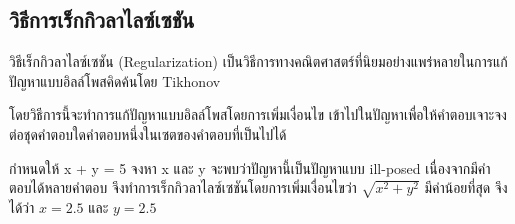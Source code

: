 \subsection{วิธีการเร็กกิวลาไลซ์เซชัน}
\hspace{1cm} วิธีเร็กกิวลาไลซ์เซชัน (Regularization) เป็นวิธีการทางคณิตศาสตร์ที่นิยมอย่างแพร่หลายในการแก้ปัญหาแบบอิลล์โพสคิดค้นโดย Tikhonov \cite{ref:regularization} 

\hspace{1cm} โดยวิธีการนี้จะทำการแก้ปัญหาแบบอิลล์โพสโดยการเพิ่มเงื่อนไข เข้าไปในปัญหาเพื่อให้คำตอบเจาะจงต่อชุดคำตอบใดคำตอบหนึ่งในเซตของคำตอบที่เป็นไปได้ 

\begin{Example}
    กำหนดให้ x + y = 5 จงหา x และ y
    จะพบว่าปัญหานี้เป็นปัญหาแบบ ill-posed เนื่องจากมีคำตอบได้หลายคำตอบ
    จึงทำการเร็กกิวลาไลซ์เซชันโดยการเพิ่มเงื่อนไขว่า $\sqrt{x^2+y^2}$ มีค่าน้อยที่สุด
    จึงได้ว่า  $x = 2.5$ และ $y = 2.5$
\end{Example}